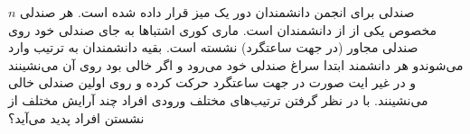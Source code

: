 \exercise
$n$
 صندلی برای انجمن دانشمندان دور یک میز قرار داده شده است. هر صندلی مخصوص یکی از از دانشمندان است. ماری کوری اشتباها به جای صندلی خود روی صندلی مجاور (در جهت ساعتگرد) نشسته است. بقیه دانشمندان به ترتیب وارد می‌شوندو هر دانشمند ابتدا سراغ صندلی خود می‌رود و اگر خالی بود روی آن می‌نشینند و در غیر ایت صورت در جهت ساعتگرد حرکت کرده  و روی اولین صندلی خالی می‌نشینند. با در نظر گرفتن ترتیب‌های مختلف ورودی افراد چند آرایش مختلف از نشستن افراد پدید می‌آید؟